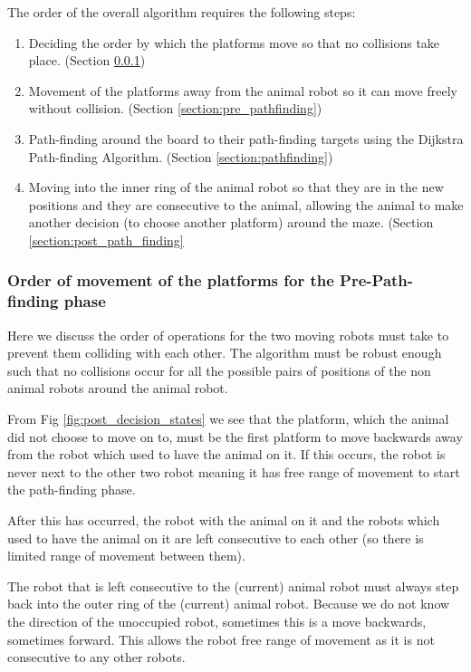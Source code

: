 The order of the overall algorithm requires the following steps:

\begin{tcolorbox}
\begin{enumerate}
    \item Deciding the order by which the platforms move so that no collisions take place. (Section \ref{section:order_of_operations})
    \item Movement of the platforms away from the animal robot so it can move freely without collision. (Section \ref{section:pre_pathfinding})
    \item Path-finding around the board to their path-finding targets using the Dijkstra Path-finding Algorithm. (Section \ref{section:pathfinding})
    \item Moving into the inner ring of the animal robot so that they are in the new positions and they are consecutive to the animal, allowing the animal to make another decision (to choose another platform) around the maze. (Section \ref{section:post_path_finding}
\end{enumerate}
\end{tcolorbox}



\subsubsection{Order of movement of the platforms for the Pre-Path-finding phase}
\label{section:order_of_operations}
Here we discuss the order of operations for the two moving robots must take to prevent them colliding with each other. The algorithm must be robust enough such that no collisions occur for all the possible pairs of positions of the non animal robots around the animal robot. 

From Fig \ref{fig:post_decision_states} we see that the platform, which the animal did not choose to move on to, must be the first platform to move backwards away from the robot which used to have the animal on it. If this occurs, the robot is never next to the other two robot meaning it has free range of movement to start the path-finding phase.

After this has occurred, the robot with the animal on it and the robots which used to have the animal on it are left consecutive to each other (so there is limited range of movement between them).

The robot that is left consecutive to the (current) animal robot must always step back into the outer ring of the (current) animal robot. Because we do not know the direction of the unoccupied robot, sometimes this is a move backwards, sometimes forward. This allows the robot free range of movement as it is not consecutive to any other robots.

